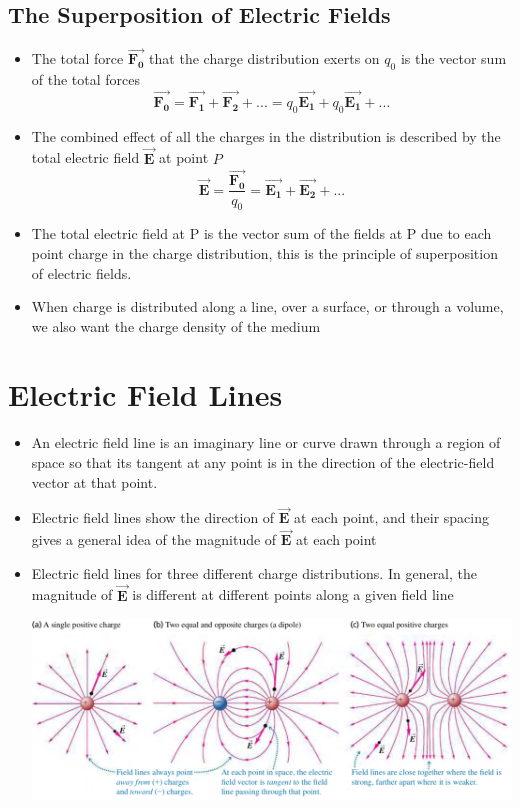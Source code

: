 \documentclass[11pt, a4paper]{article}
\begin{document}
\subsection{The Superposition of Electric Fields}
\begin{itemize}
    \item The total force $\vec{\mathbf{F_0}}$ that the charge distribution exerts on
        $q_0$ is the vector sum of the total forces
        \begin{equation}
            \vec{\mathbf{F_0}} = \vec{\mathbf{F_1}} + \vec{\mathbf{F_2}} + ... =
            q_0 \vec{\mathbf{E_1}} + q_0 \vec{\mathbf{E_1}} + ...
        \end{equation}
    \item The combined effect of all the charges in the distribution is described by the total
        electric field $\vec{\mathbf{E}}$ at point $P$
        \begin{equation}
            \vec{\mathbf{E}} = \frac{\vec{\mathbf{F_0}}}{q_0} =
            \vec{\mathbf{E_1}} + \vec{\mathbf{E_2}} + ...
        \end{equation}
    \item The total electric field at P is the vector sum of the fields at P due to each
        point charge in the charge distribution, this is the principle of superposition of
        electric fields.
    \item When charge is distributed along a line, over a surface, or through a volume,
        we also want the charge density of the medium
\end{itemize}
\section[21.6 Electric Field Lines]{Electric Field Lines}
\begin{itemize}
    \item An electric field line is an imaginary line or curve drawn through a region of space
        so that its tangent at any point is in the direction of the electric-field vector at
        that point.
    \item Electric field lines show the direction of $\vec{\mathbf{E}}$ at each point, and their spacing
        gives a general idea of the magnitude of $\vec{\mathbf{E}}$ at each point
    \item Electric field lines for three different charge distributions. In general, the
        magnitude of $\vec{\mathbf{E}}$ is different at different points along a given field line

\includegraphics[scale=0.50]{images/E_charge_distributions.png}
\end{itemize}
\end{document}
